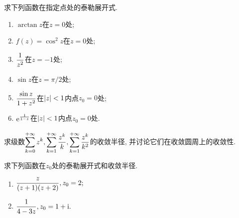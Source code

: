 \begin{yyEx}
\end{yyEx}

\begin{yyEx}
	求下列函数在指定点处的泰勒展开式.
	\begin{enumerate}
		\item $\arctan z$在$z = 0$处;
		\item $f(z) = \cos^2z$在$z = 0$处;
		\item $\begin{lgathered}
			\frac{1}{z^2}
		\end{lgathered}$在$z = -1$处;
		\item $\sin z$在$z = \pi/2$处;
		\item $\begin{lgathered}
		\end{lgathered}$在$<1$内点$z_0 = 0$处;
		\item $\begin{lgathered}
			^
		\end{lgathered}$在$<1$内点$z_0 = 0$处.
	\end{enumerate}
\end{yyEx}

\begin{yyEx}
	求级数$\begin{lgathered}
		\sum_{k=0}^{+\infty}z^k,\sum_{k=1}^{+\infty},\sum_{k=1}^{+\infty}
	\end{lgathered}$的收敛半径, 并讨论它们在收敛圆周上的收敛性.
\end{yyEx}

\begin{yyEx}
	求下列函数在$z_0$处的泰勒展开式和收敛半径.
	\begin{enumerate}
		\item $\begin{lgathered}
			,z_0 = 2;
		\end{lgathered}$
		\item $\begin{lgathered}
			,z_0 = 1+\mathrm{i}.
		\end{lgathered}$
	\end{enumerate}
\end{yyEx}

